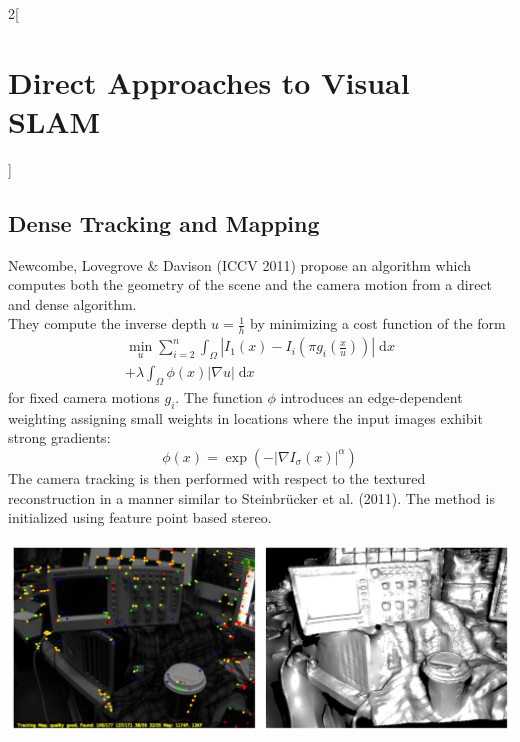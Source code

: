 \documentclass[oneside,fontsize=11pt,paper=a4]{scrartcl}
\newenvironment{myfigure}
  {\par\medskip\noindent\minipage{\linewidth}}
  {\endminipage\par\medskip}
\begin{document}
\begin{multicols}{2}[\section{Direct Approaches to Visual SLAM}]
\subsection{Dense Tracking and Mapping}
Newcombe, Lovegrove \& Davison (ICCV 2011) propose an algorithm which computes both the geometry of the scene and the camera motion from a direct and dense algorithm.\\
They compute the inverse depth $u = \frac{1}{h}$ by minimizing a cost function of the form
\begin{equation*}
\begin{split}
    \min_u \sum_{i = 2}^n \int_{\Omega} \left|I_1(x) - I_i \left(\pi g_i \left(\frac{x}{u}\right)\right) \right| \;\mathrm{d}x \\ + \lambda \int_{\Omega} \phi(x) |\nabla u| \;\mathrm{d}x
\end{split}
\end{equation*}
for fixed camera motions $g_i$.
The function $\phi$ introduces an edge-dependent weighting assigning small weights in locations where the input images exhibit strong gradients:
\begin{equation*}
    \phi (x) = \exp(-|\nabla I_{\sigma} (x)|^{\alpha})
\end{equation*}
The camera tracking is then performed with respect to the textured reconstruction in a manner similar to Steinbrücker et al. (2011).
The method is initialized using feature point based stereo.
\begin{myfigure}
 \centering
 \includegraphics[width=0.9\linewidth]{Images/Dense_tracking_and_mapping.jpg}
\end{myfigure}


\end{multicols}
\end{document}
